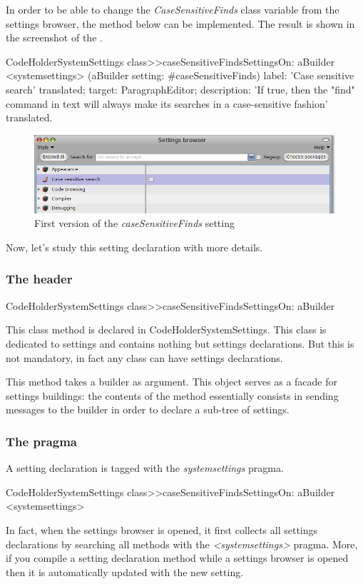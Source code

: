 \documentclass[a4paper,10pt,twoside]{book}
\begin{document}
In order to be able to change the \textit{CaseSensitiveFinds} class variable from the settings browser, the method below can be implemented. The result is shown in the screenshot of the . 

\begin{code}{}
CodeHolderSystemSettings class>>caseSensitiveFindsSettingsOn: aBuilder
	<systemsettings>
	(aBuilder setting: #caseSensitiveFinds) 
		label: 'Case sensitive search' translated;
		target: ParagraphEditor;
		description: 'If true, then the "find" command in text will always make its searches in a case-sensitive fashion' translated.
\end{code}

\begin{figure}[tbh]
\begin{center}
\includegraphics[scale=0.4]{caseSensitiveFinds_setting_declaration1}
\caption{First version of the \textit{caseSensitiveFinds} setting}
\end{center}
\end{figure}

Now, let's study this setting declaration with more details. 

\subsubsection{The header}
\begin{code}{}
CodeHolderSystemSettings class>>caseSensitiveFindsSettingsOn: aBuilder
\end{code}
This class method is declared in CodeHolderSystemSettings. This class is dedicated to settings and contains nothing but settings declarations. But this is not mandatory, in fact any class can have settings declarations. 

This method takes a builder as argument. This object serves as a facade for settings buildings: the contents of the method essentially consists in sending messages to the builder in order to declare a sub-tree of settings.

\subsubsection{The pragma}
A setting declaration is tagged with the \textit{systemsettings} pragma.
\begin{code}{}
CodeHolderSystemSettings class>>caseSensitiveFindsSettingsOn: aBuilder
	<systemsettings>
\end{code}
In fact, when the settings browser is opened, it first collects all settings declarations by searching all methods with the \textit{<systemsettings>} pragma. More, if you compile a setting declaration method while a settings browser is opened then it is automatically updated with the new setting. 
\end{document}
